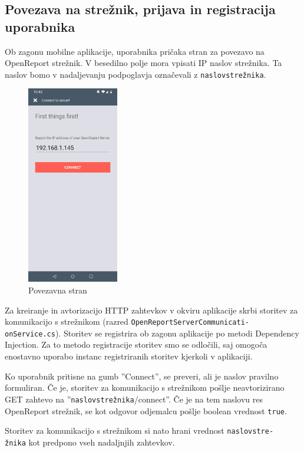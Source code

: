 \documentclass[a4paper, 12pt]{book}
\begin{document}
\subsection{Povezava na strežnik, prijava in registracija uporabnika}

Ob zagonu mobilne aplikacije, uporabnika pričaka stran za povezavo na OpenReport strežnik.
V besedilno polje mora vpisati IP naslov strežnika.
Ta naslov bomo v nadaljevanju podpoglavja označevali z \texttt{naslovstrežnika}.


\begin{figure}[H]
\begin{center}
\includegraphics[width=4cm]{app_connect}
\end{center}
\caption{Povezavna stran}
\label{app_connect}
\end{figure}


Za kreiranje in avtorizacijo HTTP zahtevkov v okviru aplikacije skrbi storitev za komunikacijo s strežnikom (razred \texttt{OpenReportServerCommunicati-\\onService.cs}).
Storitev se registrira ob zagonu aplikacije po metodi Dependency Injection.
Za to metodo registracije storitev smo se odločili, saj omogoča enostavno uporabo instanc registriranih storitev kjerkoli v aplikaciji.

Ko uporabnik pritisne na gumb ''Connect'', se preveri, ali je naslov pravilno formuliran.
Če je, storitev za komunikacijo s strežnikom pošlje neavtorizirano GET zahtevo na ''\texttt{naslovstrežnika}/connect''. 
Če je na tem naslovu res OpenReport strežnik, se kot odgovor odjemalcu pošlje boolean vrednost \texttt{true}.

Storitev za komunikacijo s strežnikom si nato hrani vrednost \texttt{naslovstre-\\žnika} kot predpono vseh nadaljnjih zahtevkov.
\end{document}
